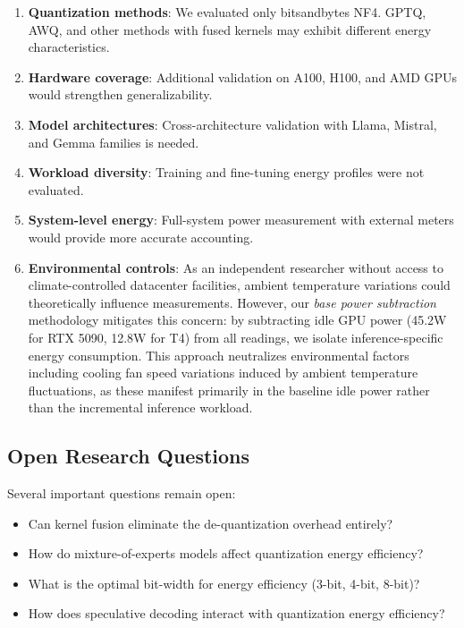 \documentclass[11pt]{article}
\begin{document}
\begin{enumerate}
    \item \textbf{Quantization methods}: We evaluated only bitsandbytes NF4. GPTQ, AWQ, and other methods with fused kernels may exhibit different energy characteristics.
    
    \item \textbf{Hardware coverage}: Additional validation on A100, H100, and AMD GPUs would strengthen generalizability.
    
    \item \textbf{Model architectures}: Cross-architecture validation with Llama, Mistral, and Gemma families is needed.
    
    \item \textbf{Workload diversity}: Training and fine-tuning energy profiles were not evaluated.
    
    \item \textbf{System-level energy}: Full-system power measurement with external meters would provide more accurate accounting.
    
    \item \textbf{Environmental controls}: As an independent researcher without access to climate-controlled datacenter facilities, ambient temperature variations could theoretically influence measurements. However, our \textit{base power subtraction} methodology mitigates this concern: by subtracting idle GPU power (45.2W for RTX 5090, 12.8W for T4) from all readings, we isolate inference-specific energy consumption. This approach neutralizes environmental factors including cooling fan speed variations induced by ambient temperature fluctuations, as these manifest primarily in the baseline idle power rather than the incremental inference workload.
\end{enumerate}

\subsection{Open Research Questions}

Several important questions remain open:
\begin{itemize}
    \item Can kernel fusion eliminate the de-quantization overhead entirely?
    \item How do mixture-of-experts models affect quantization energy efficiency?
    \item What is the optimal bit-width for energy efficiency (3-bit, 4-bit, 8-bit)?
    \item How does speculative decoding interact with quantization energy efficiency?
\end{itemize}
\end{document}
